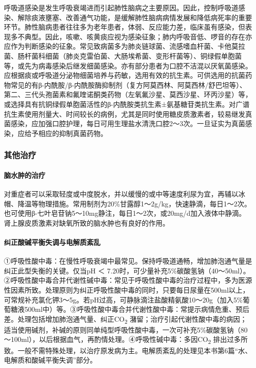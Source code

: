 呼吸道感染是发生呼吸衰竭进而引起肺性脑病之主要原因。因此，控制呼吸道感染、解除痰液壅塞、改善通气功能，是缓解肺性脑病病情发展和降低病死率的重要环节。肺性脑病患者往往多为老年患者，体弱、反应能力差，临床虽有感染，但表现多不典型。因此，咳嗽、咳黄痰应视为感染征象；肺内呼吸音低、啰音的存在亦应作为判断感染的征象。常见致病菌多为肺炎链球菌、流感嗜血杆菌、卡他莫拉菌、肠杆菌科细菌（肺炎克雷伯菌、大肠埃希菌、变形杆菌等）、铜绿假单胞菌等，或先为病毒感染后继发细菌感染。亦有部分患者为口腔不洁混以厌氧菌感染。应根据痰或呼吸道分泌物细菌培养与药敏，选用有效的抗生素。可供选用的抗菌药物常见的有β-内酰胺/β-内酰胺酶抑制剂（复方阿莫西林、阿莫西林/舒巴坦等）、第二、三代头孢菌素和氟喹诺酮类药物（左氧氟沙星、莫西沙星、环丙沙星）等，或选择具有抗铜绿假单胞菌活性的β-内酰胺类抗生素±氨基糖苷类抗生素。对广谱抗生素使用剂量大、时间较长的病例，尤其是同时使用糖皮质激素者，较易继发真菌感染，应加强口腔护理，每日可用生理盐水清洗口腔2～3次。一旦证实为真菌感染，应给予相应的抑制真菌药物。

\subsubsection{其他治疗}

\paragraph{脑水肿的治疗}

对重症者可以采取轻度或中度脱水，并以缓慢的或中等速度利尿为宜，再辅以冰帽、降温等物理措施。常用制剂为20\%甘露醇1～2g/kg，快速静滴，每日1～2次。也可使用β-七叶皂苷钠5～10mg静注，每日1～2次，或20mg/d加入液体中静滴。肾上腺皮质激素对缺氧所致的脑水肿也有良好的作用。

\paragraph{纠正酸碱平衡失调与电解质紊乱}

①呼吸性酸中毒：在慢性呼吸衰竭中最常见。保持呼吸道通畅，增加肺泡通气量是纠正此型失衡的关键。仅当pH
＜
7.20时，可少量补充5\%碳酸氢钠（40～50ml）。②呼吸性酸中毒合并代谢性碱中毒：常见于呼吸性酸中毒的治疗过程中，多为医源性因素所致。处理原则为纠正呼吸性酸中毒的同时，只要每日尿量在500ml以上，可常规补充氯化钾3～5g。若pH过高，可静脉滴注盐酸精氨酸10～20g（加入5\%葡萄糖液500ml中）等。③呼吸性酸中毒合并代谢性酸中毒：常提示病情危重、预后差。处理包括增加肺泡通气量、纠正CO\textsubscript{2}
潴留；治疗引起代谢性酸中毒的病因；适当使用碱剂，补碱的原则同单纯型呼吸性酸中毒，一次可补充5\%碳酸氢钠（80～100ml），以后根据血气，再酌情处理。④呼吸性碱中毒：多因CO\textsubscript{2}
排出过多所致。一般不需特殊处理，以治疗原发病为主。电解质紊乱的处理见本书第6篇“水、电解质和酸碱平衡失调”部分。

